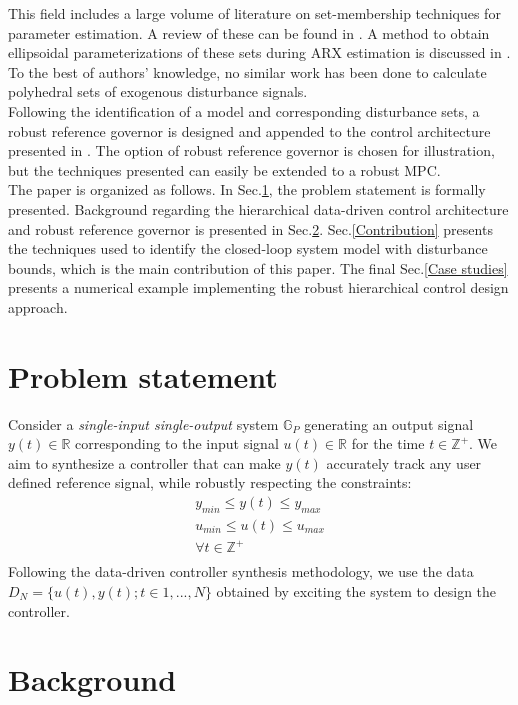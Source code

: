 \documentclass[letterpaper, 10 pt, conference]{ieeeconf}  %
\begin{document}
This field includes a large volume of literature on set-membership techniques for parameter estimation. A review of these can be found in \cite{WALTER1990449}. A method to obtain ellipsoidal parameterizations of these sets during ARX estimation is discussed in \cite{7330793}. To the best of authors' knowledge, no similar work has been done to calculate polyhedral sets of exogenous disturbance signals.
 \\ \indent
  Following the identification of a model and corresponding disturbance sets, a robust reference governor is designed and appended to the control architecture presented in \cite{7932940}.
 The option of robust reference governor is chosen for illustration, but the techniques presented can easily be extended to a robust MPC.
 \\ \indent
 The paper is organized as follows. In Sec.\ref{Problem statement}, the problem statement is formally presented. Background regarding the hierarchical data-driven control architecture and robust reference governor is presented in Sec.\ref{Background}. Sec.\ref{Contribution} presents the techniques used to identify the closed-loop system model with disturbance bounds, which is the main contribution of this paper. The final Sec.\ref{Case studies} presents a numerical example implementing the robust hierarchical control design approach. 

\section{Problem statement}
\label{Problem statement}
Consider a \textit{single-input single-output} system $\mathbb{G}_P$ generating an output signal $y(t) \in \mathbb{R}$ corresponding to the input signal $u(t) \in \mathbb{R}$ for the time $t \in \mathbb{Z}^+$. We aim to synthesize a controller that can make $y(t)$ accurately track any user defined reference signal, while robustly respecting the constraints:
\begin{equation*} 
\begin{matrix}
y_{min}\leq y(t) \leq y_{max}\\
u_{min}\leq u(t) \leq u_{max} \\
\forall t \in \mathbb{Z}^+\\
\end{matrix}
\end{equation*} 
Following the data-driven controller synthesis methodology, we use the data $D_{N}=\{u(t),y(t);t\in{1,...,N}\}$ obtained by exciting the system to design the controller.
\section{Background}
\label{Background}
\end{document}
